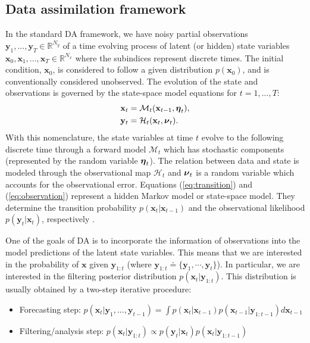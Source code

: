 \documentclass[11pt,a4paper]{article}
\renewcommand{\v}[1]{\ensuremath{\mathbf{#1}}}
\newcommand{\gv}[1]{\ensuremath{\mbox{\boldmath$ #1 $}}}
\begin{document}
\subsection{Data assimilation framework} \label{sec:da_framework}

In the standard DA framework,  we have noisy partial observations $ \v y_1, ..., \v y_T\in \mathbb R^{N_y}$ of a time evolving process of latent (or hidden) state variables $\v x_0, \v x_1, ..., \v x_T \in \mathbb R^{N_x}$ where the subindices represent discrete times. The initial condition, $\v x_0$, is considered to follow a given distribution $p(\v x_0)$, and is conventionally considered unobserved. The evolution of the state and observations is governed by the state-space model equations for $t = 1, ..., T$:
\begin{align}
    \v x_t &= \mathcal M_{t} (\v x_{t-1}, \gv\eta_t), \label{eq:transition} \\
    \v y_t &= \mathcal H_{t} (\v x_t, \gv\nu_t). \label{eq:observation}
\end{align}
With this nomenclature, the state variables at time $t$ evolve to the following discrete time through a forward model $\mathcal M_t$ which has stochastic components (represented by the random variable $\gv\eta_t$). The relation between data and state is modeled through the observational map $\mathcal H_t$ and $\gv\nu_t$ is a random variable which accounts for the observational error. Equations (\ref{eq:transition}) and (\ref{eq:observation}) represent a hidden Markov model or state-space model. They determine the transition probability $p(\v x_t | \v x_{t-1})$ and the observational likelihood $p(\v y_t | \v x_t)$, respectively \citep{Cappe2006}.

One of the goals of DA is to incorporate the information of observations into the model predictions of the latent state variables. This means that we are interested in the probability of $\v x$ given $ \v y_{1:t}$ (where $\v y_{1:t}\doteq \{\v y_{1},\cdots, \v y_t\}$). In particular, we are interested in the filtering posterior distribution $p(\v x_t | \v y_{1:t})$. This distribution is usually obtained by a two-step iterative procedure: 
\begin{itemize}
    \item Forecasting step:
    $p(\v x_t | \v y_1, ...,  \v y_{t-1}) =
    \int p(\v x_t | \v x_{t-1}) p(\v x_{t-1} | \v y_{1:t-1}) d\v x_{t-1}$ 
    \item Filtering/analysis step:
    $p(\v x_t | \v y_{1:t}) 
    \propto p(\v y_t | \v x_t) p(\v x_t | \v y_{1:t-1})$ 
\end{itemize}
\end{document}
